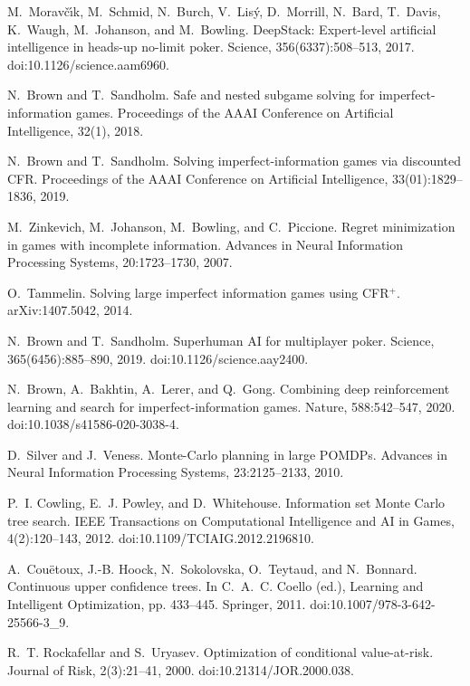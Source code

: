 \small
\begin{thebibliography}{99}

M.~Morav\v{c}\'{\i}k, M.~Schmid, N.~Burch, V.~Lis\'{y}, D.~Morrill, N.~Bard, T.~Davis, K.~Waugh, M.~Johanson, and M.~Bowling.
DeepStack: Expert-level artificial intelligence in heads-up no-limit poker.
Science, 356(6337):508--513, 2017. doi:10.1126/science.aam6960.

N.~Brown and T.~Sandholm.
Safe and nested subgame solving for imperfect-information games.
Proceedings of the AAAI Conference on Artificial Intelligence, 32(1), 2018.

N.~Brown and T.~Sandholm.
Solving imperfect-information games via discounted CFR.
Proceedings of the AAAI Conference on Artificial Intelligence, 33(01):1829--1836, 2019.

M.~Zinkevich, M.~Johanson, M.~Bowling, and C.~Piccione.
Regret minimization in games with incomplete information.
Advances in Neural Information Processing Systems, 20:1723--1730, 2007.

O.~Tammelin.
Solving large imperfect information games using CFR$^+$.
arXiv:1407.5042, 2014.

N.~Brown and T.~Sandholm.
Superhuman AI for multiplayer poker.
Science, 365(6456):885--890, 2019. doi:10.1126/science.aay2400.

N.~Brown, A.~Bakhtin, A.~Lerer, and Q.~Gong.
Combining deep reinforcement learning and search for imperfect-information games.
Nature, 588:542--547, 2020. doi:10.1038/s41586-020-3038-4.

D.~Silver and J.~Veness.
Monte-Carlo planning in large POMDPs.
Advances in Neural Information Processing Systems, 23:2125--2133, 2010.

P.~I. Cowling, E.~J. Powley, and D.~Whitehouse.
Information set Monte Carlo tree search.
IEEE Transactions on Computational Intelligence and AI in Games, 4(2):120--143, 2012. doi:10.1109/TCIAIG.2012.2196810.

A.~Cou\"{e}toux, J.-B. Hoock, N.~Sokolovska, O.~Teytaud, and N.~Bonnard.
Continuous upper confidence trees.
In C.~A.~C. Coello (ed.), Learning and Intelligent Optimization, pp. 433--445. Springer, 2011. doi:10.1007/978-3-642-25566-3\_9.

R.~T. Rockafellar and S.~Uryasev.
Optimization of conditional value-at-risk.
Journal of Risk, 2(3):21--41, 2000. doi:10.21314/JOR.2000.038.


\end{thebibliography}
